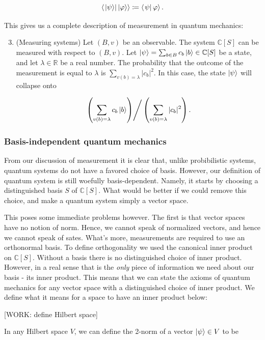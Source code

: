 \documentclass{article}
\theoremstyle{definition}
\newcommand{\RR}{\mathbb{R}}
\newcommand{\CC}{\mathbb{C}}
\newcommand{\0}{\left|0\right>}
\newcommand{\1}{\left|1\right>}
\numberwithin{figure}{section}
\begin{document}
$$\left< \left. \ket{\psi} \right| \ket{\varphi}\right>\coloneqq \left< \left. \psi \right| \varphi \right>.$$

This gives us a complete description of measurement in quantum mechanics:

\begin{enumerate}[1''.]
\setcounter{enumi}{2}

\item (Measuring systems) Let $(B,v)$ be an observable. The system $\CC[S]$ can be measured with respect to $(B,v)$. Let $\ket{\psi}=\sum_{b\in B}c_b \ket{b}\in \CC[S]$ be a state, and let $\lambda\in \RR$ be a real number. The probability that the outcome of the measurement is equal to $\lambda$ is $\sum_{v(b)=\lambda}|c_b|^2$. In this case, the state $\ket{\psi}$ will collapse onto

$$\left.\left(\sum_{v(b)=\lambda}c_b \ket{b}\right)\right/ \left(\sum_{v(b)=\lambda}|c_b|^2\right).$$
\end{enumerate}



\subsubsection{Basis-independent quantum mechanics}

From our discussion of measurement it is clear that, unlike probibilistic systems, quantum systems do not have a favored choice of basis. However, our definition of quantum system is still woefully basis-dependent. Namely, it starts by choosing a distinguished basis $S$ of $\CC[S]$. What would be better if we could remove this choice, and make a quantum system simply a vector space.

This poses some immediate problems however. The first is that vector spaces have no notion of norm. Hence, we cannot speak of normalized vectors, and hence we cannot speak of sates. What's more, measurements are required to use an orthonormal basis. To define orthogonality we used the canonical inner product on $\CC[S]$. Without a basis there is no distinguished choice of inner product. However, in a real sense that is the \textit{only} piece of information we need about our basis - its inner product. This means that we can state the axioms of quantum mechanics for any vector space with a distinguished choice of inner product. We define what it means for a space to have an inner product below:

[WORK: define Hilbert space]

In any Hilbert space $V$, we can define the 2-norm of a vector $\ket{\psi}\in V$ to be
\end{document}
